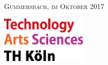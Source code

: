 \begin{titlepage}
\begin{center}
    \vspace{0.7cm}

    \small{\textsc{Gummersbach, im Oktober 2017}}

  \end{center}

  \vspace{0.3cm}

  \begin{flushright}
    \includegraphics[height=2.25cm]{./assets/logo_th-koeln.eps}
  \end{flushright}
\end{titlepage}

